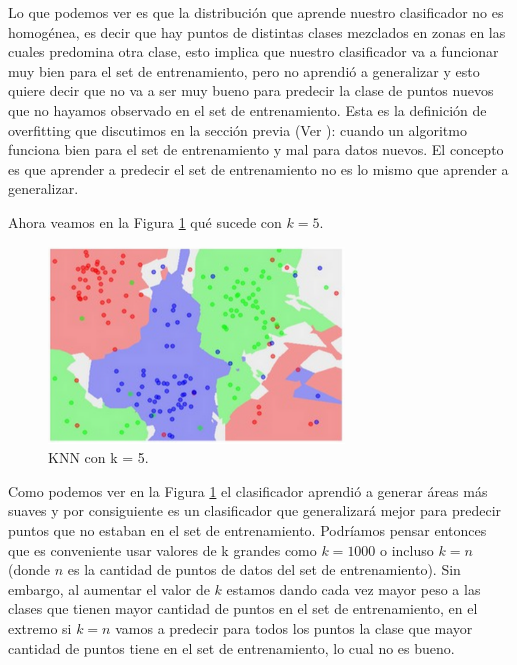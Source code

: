\documentclass[12pt,a4paper]{article}
\begin{document}
\begin{sloppypar}
Lo que podemos ver es que la distribución que aprende nuestro clasificador no es homogénea, es decir que hay puntos de distintas clases mezclados en zonas en las cuales predomina otra clase, esto implica que nuestro clasificador va a funcionar muy bien para el set de entrenamiento, pero no aprendió a generalizar y esto quiere decir que no va a ser muy bueno para predecir la clase de puntos nuevos que no hayamos observado en el set de entrenamiento. Esta es la definición de overfitting que discutimos en la sección previa (Ver \textit{}): cuando un algoritmo funciona bien para el set de entrenamiento y mal para datos nuevos. El concepto es que aprender a predecir el set de entrenamiento no es lo mismo que aprender a generalizar.

\cleardoublepage
Ahora veamos en la Figura \ref{fig:KNN_k_5} qué sucede con $k = 5$.

\begin{figure}[H]    %
 \centering
 \includegraphics[width=0.7\textwidth]{images/KNN_k_5.png}
 \captionsetup{justification=centering,margin=2cm}
 \caption{KNN con k = 5. \cite{apunte_uba}} 
 \label{fig:KNN_k_5}
\end{figure}

Como podemos ver en la Figura \ref{fig:KNN_k_5} el clasificador aprendió a generar áreas más suaves y por consiguiente es un clasificador que generalizará mejor para predecir puntos que no estaban en el set de entrenamiento. Podríamos pensar entonces que es conveniente usar valores de k grandes como $k = 1000$ o incluso $k = n$ (donde $n$ es la cantidad de puntos de datos del set de entrenamiento). Sin embargo, al aumentar el valor de $k$ estamos dando cada vez mayor peso a las clases que tienen mayor cantidad de puntos en el set de entrenamiento, en el extremo si $k = n$ vamos a predecir para todos los puntos la clase que mayor cantidad de puntos tiene en el set de entrenamiento, lo cual no es bueno. 


\end{sloppypar}
\end{document}
